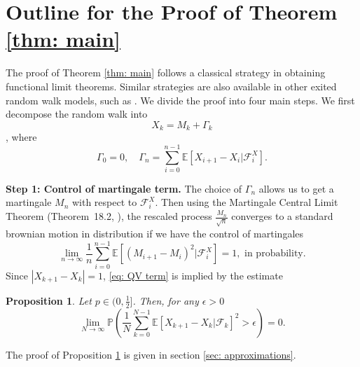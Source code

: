 \documentclass[twoside,12pt,a4paper]{article}
\newtheorem{proposition}{Proposition}[section]
\numberwithin{equation}{section}
\newcommand{\abs}[1]{\left\vert #1 \right\vert}
\begin{document}
	\section{Outline for the Proof of Theorem \ref{thm: main}}\label{sec: proof of main}
	The proof of Theorem \ref{thm: main} follows a classical strategy in obtaining functional limit theorems. 
	Similar strategies are also available in other exited random walk models, such as \cite{KP16,KMP22}.
	 We divide the proof into four main steps. We first decompose the random walk into
	\[
	X_k = M_k+ \Gamma_k 
\] ,
	where
	$$ 
	\Gamma_0 = 0, \quad \Gamma_n = \sum_{i=0}^{n-1} \mathbb{E}\left[ X_{i+1}-X_i | \mathcal{F}_i^X \right].
	$$ 
	
	\textbf{Step 1: Control of martingale term.}
	The choice of $\Gamma_n$ allows us to get a martingale $M_n$ with respect to $\mathcal{F}_i^X.$ Then using the Martingale Central Limit Theorem (Theorem~18.2, \cite{B99}), the rescaled process $\frac{M_n}{\sqrt{n}}$ converges to a standard brownian motion in distribution if we have the control of martingales 
	\begin{equation}\label{eq: QV term}
		\lim_{n\to \infty}\frac{1}{n} \sum_{i=0}^{n-1}\mathbb{E}\left[ (M_{i+1}- M_{i})^2 |\mathcal{F}_i^X \right] =1,  \mbox{ in probability}.
	\end{equation}
	Since $\abs{X_{k+1}-X_k}=1$,  \eqref{eq: QV term} is implied by the estimate
	\begin{proposition} \label{lm: control of martingale} 
		Let $p\in (0,\frac{1}{2}]$. Then, for any $\epsilon >0$
		\begin{equation}\label{eq:  term}
			\lim_{N \to \infty }\mathbb{P}\left(\frac{1}{N} \sum_{k = 0}^{N-1} \mathbb{E}\left[ X_{k+1} - X_k | \mathcal{F}_k \right]^2 > \epsilon \right) =0. 
		\end{equation}
	\end{proposition}
	The proof of Proposition \ref{lm: control of martingale} is given in section \ref{sec: approximations}.
	
\end{document}
